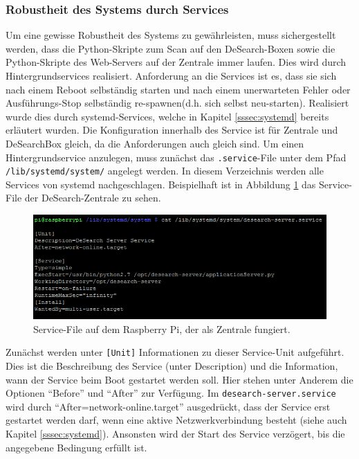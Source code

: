 \subsubsection{Robustheit des Systems durch Services}\label{sssec:services}
Um eine gewisse Robustheit des Systems zu gewährleisten, muss sichergestellt werden, dass die Python-Skripte zum Scan auf den DeSearch-Boxen sowie die Python-Skripte des Web-Servers auf der Zentrale immer laufen. Dies wird durch Hintergrundservices realisiert. Anforderung an die Services ist es, dass sie sich nach einem Reboot selbständig starten und nach einem unerwarteten Fehler oder Ausführungs-Stop selbständig re-spawnen(d.h. sich selbst neu-starten). Realisiert wurde dies durch systemd-Services, welche in Kapitel \ref{sssec:systemd} bereits erläutert wurden. Die Konfiguration innerhalb des Service ist für Zentrale und DeSearchBox gleich, da die Anforderungen auch gleich sind. Um einen Hintergrundservice anzulegen, muss zunächst das \texttt{.service}-File unter dem Pfad \texttt{/lib/systemd/system/} angelegt werden. In diesem Verzeichnis werden alle Services von systemd nachgeschlagen. Beispielhaft ist in Abbildung \ref{fig:service} das Service-File der DeSearch-Zentrale zu sehen.
\begin{figure}[bth]
	\centering
	\includegraphics[width=1.0\linewidth]{images/service-systemd}
	\caption[Service-File auf dem Zentral-Pi]{Service-File auf dem Raspberry Pi, der als Zentrale fungiert.}
	\label{fig:service}
\end{figure}
Zunächst werden unter \texttt{[Unit]} Informationen zu dieser Service-Unit aufgeführt. Dies ist die Beschreibung des Service (unter Description) und die Information, wann der Service beim Boot gestartet werden soll. Hier stehen unter Anderem die Optionen \enquote{Before} und \enquote{After} zur Verfügung. Im \texttt{desearch-server.service} wird durch \enquote{After=network-online.target} ausgedrückt, dass der Service erst gestartet werden darf, wenn eine aktive Netzwerkverbindung besteht (siehe auch Kapitel \ref{sssec:systemd}). Ansonsten wird der Start des Service verzögert, bis die angegebene Bedingung erfüllt ist.
